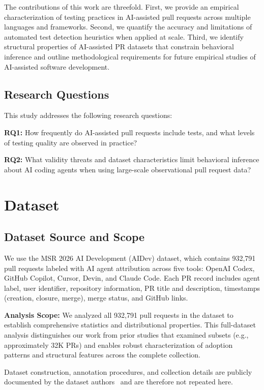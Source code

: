 \documentclass[conference]{IEEEtran}
\begin{document}
The contributions of this work are threefold. First, we provide an empirical characterization of testing practices in AI-assisted pull requests across multiple languages and frameworks. Second, we quantify the accuracy and limitations of automated test detection heuristics when applied at scale. Third, we identify structural properties of AI-assisted PR datasets that constrain behavioral inference and outline methodological requirements for future empirical studies of AI-assisted software development.

\subsection{Research Questions}

This study addresses the following research questions:

\textbf{RQ1:} How frequently do AI-assisted pull requests include tests, and what levels of testing quality are observed in practice?

\textbf{RQ2:} What validity threats and dataset characteristics limit behavioral inference about AI coding agents when using large-scale observational pull request data?

\section{Dataset}

\subsection{Dataset Source and Scope}

We use the MSR 2026 AI Development (AIDev) dataset, which contains 932,791 pull requests labeled with AI agent attribution across five tools: OpenAI Codex, GitHub Copilot, Cursor, Devin, and Claude Code. Each PR record includes agent label, user identifier, repository information, PR title and description, timestamps (creation, closure, merge), merge status, and GitHub links.

\textbf{Analysis Scope:} We analyzed all 932,791 pull requests in the dataset to establish comprehensive statistics and distributional properties. This full-dataset analysis distinguishes our work from prior studies that examined subsets (e.g., approximately 32K PRs) and enables robust characterization of adoption patterns and structural features across the complete collection.

Dataset construction, annotation procedures, and collection details are publicly documented by the dataset authors~\cite{li2026aidev} and are therefore not repeated here.
\end{document}
